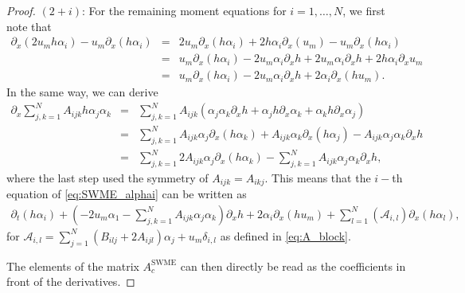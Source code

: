 \documentclass[a4paper, 11pt]{article}
\begin{document}
\begin{proof}
    \noindent$(2+i)$: For the remaining moment equations for $i=1,\ldots, N$, we first note that
        \begin{eqnarray}
            \partial_x\left(2 u_m h \alpha_i\right)-u_m \partial_x\left(h \alpha_i\right) & =&2 u_m \partial_x\left(h \alpha_i\right)+2 h \alpha_i \partial_x\left(u_m\right)-u_m \partial_x\left(h \alpha_i\right) \\
            & =&u_m \partial_x\left(h \alpha_i\right)-2 u_m \alpha_i \partial_x h+2 u_m \alpha_i \partial_x h+2 h \alpha_i \partial_x u_m \\
            & =&u_m \partial_x\left(h \alpha_i\right)-2 u_m \alpha_i \partial_x h+2 \alpha_i \partial_x\left(h u_m\right).
        \end{eqnarray}
        In the same way, we can derive
        \begin{eqnarray}
            \partial_x \sum_{j,k=1}^N A_{i j k} h \alpha_j \alpha_k & =&\sum_{j,k=1}^N A_{i j k} \left( \alpha_j \alpha_k \partial_x h+ \alpha_{j} h \partial_x \alpha_k +  \alpha_k h \partial_x \alpha_j \right) \\
            & = &\sum_{j,k=1}^N A_{i j k} \alpha_j \partial_x\left(h \alpha_k\right)+A_{i j k} \alpha_k \partial_x\left(h \alpha_j\right)-A_{i j k} \alpha_j \alpha_k \partial_x h \\
            & =& \sum_{j,k=1}^N 2 A_{i j k} \alpha_j \partial_x\left(h \alpha_k\right)-\sum_{j,k=1}^N A_{i j k} \alpha_j \alpha_k \partial_x h,
        \end{eqnarray}
        where the last step used the symmetry of $A_{i j k}=A_{i k j}$.
        This means that the $i-$th equation of \eqref{eq:SWME_alphai} can be written as
        \begin{eqnarray}
            \partial_t\left(h \alpha_i\right) + \left( -2u_m \alpha_1 -\sum_{j,k=1}^N A_{i j k} \alpha_j \alpha_k \right) \partial_x h + 2\alpha_i \partial_x \left(h u_m \right) + \sum_{l=1}^N \left( \mathcal{A}_{i,l} \right) \partial_x \left( h \alpha_l\right),
        \end{eqnarray}
        for $\mathcal{A}_{i,l} = \sum\limits_{j=1}^N \left(B_{ilj} + 2 A_{i j l}\right) \alpha_j + u_m \delta_{i,l}$ as defined in \eqref{eq:A_block}.

        The elements of the matrix $A^{\textrm{SWME}}_{c}$ can then directly be read as the coefficients in front of the derivatives.
\end{proof}
\end{document}
